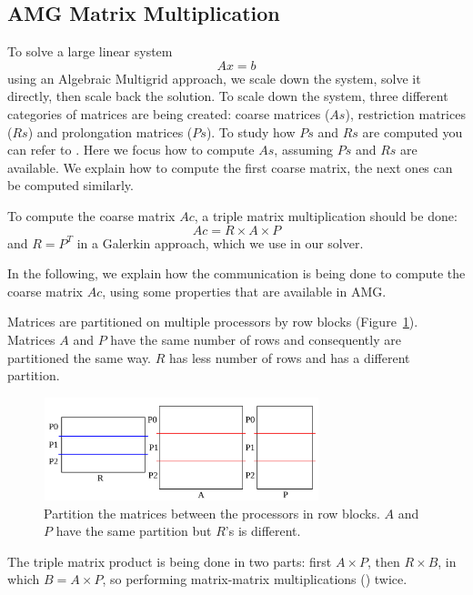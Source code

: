 \subsection{AMG Matrix Multiplication}
\label{sec:amg}

To solve a large linear system 
\begin{equation}
 Ax = b
\end{equation}
using an Algebraic Multigrid approach, we scale down the system, solve it directly, then scale back the solution. To scale down the system, three different categories of matrices are being created: coarse matrices ($As$), restriction matrices ($Rs$) and prolongation matrices ($Ps$). To study how $Ps$ and $Rs$ are computed you can refer to \cite{bell2012exposing, treister2015non}. Here we focus how to compute $As$, assuming $Ps$ and $Rs$ are available. We explain how to compute the first coarse matrix, the next ones can be computed similarly.

To compute the coarse matrix $Ac$, a triple matrix multiplication should be done:
\begin{equation}
 Ac = R \times A \times P
\end{equation}
and $R = P^T$ in a Galerkin approach, which we use in our solver.

In the following, we explain how the communication is being done to compute the coarse matrix $Ac$, using some properties that are available in AMG.

Matrices are partitioned on multiple processors by row blocks (Figure~\ref{fig:partition}). Matrices $A$ and $P$ have the same number of rows and consequently are partitioned the same way. $R$ has less number of rows and has a different partition.

\begin{figure}[tbh]
 \centering
 \includegraphics[width=8cm,height=3cm]{./figures/partition.pdf}
 \caption{Partition the matrices between the processors in row blocks. $A$ and $P$ have the same partition but $R$'s is different.}
 \label{fig:partition}
\end{figure}

The triple matrix product is being done in two parts: first $A \times P$, then $R \times B$, in which $B = A \times P$, so performing matrix-matrix multiplications (\mm) twice.

